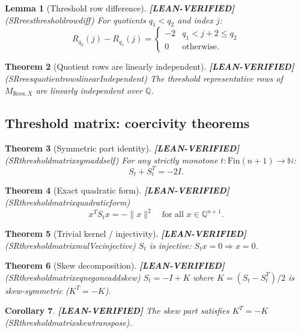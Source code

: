 \documentclass[11pt]{article}
\newtheorem{theorem}{Theorem}[section]
\newtheorem{lemma}[theorem]{Lemma}
\newtheorem{corollary}[theorem]{Corollary}
\theoremstyle{remark}
\newcommand{\LEANVERIFIED}{\textbf{\color{green!60!black}[LEAN-VERIFIED]}}
\DeclareRobustCommand{\_}{\ifmmode\text{\textunderscore}\else\textunderscore\allowbreak\fi}
\begin{document}
\begin{lemma}[Threshold row difference] \LEANVERIFIED{} \textnormal{(SR\_rees\_threshold\_row\_diff)}
For quotients $q_1 < q_2$ and index $j$:
\[
R_{q_2}(j) - R_{q_1}(j) = \begin{cases} -2 & q_1 < j+2 \leq q_2 \\ 0 & \text{otherwise.} \end{cases}
\]
\end{lemma}

\begin{theorem}[Quotient rows are linearly independent] \LEANVERIFIED{} \textnormal{(SR\_rees\_quotient\_rows\_linearIndependent)}
The threshold representative rows of $M_{\mathrm{Rees},X}$ are linearly independent over $\mathbb{Q}$.
\end{theorem}

\subsection{Threshold matrix: coercivity theorems}

\begin{theorem}[Symmetric part identity] \LEANVERIFIED{} \textnormal{(SR\_threshold\_matrix\_sym\_add\_self)}
For any strictly monotone $t : \mathrm{Fin}(n+1) \to \mathbb{N}$:
\[
S_t + S_t^T = -2I.
\]
\end{theorem}

\begin{theorem}[Exact quadratic form] \LEANVERIFIED{} \textnormal{(SR\_threshold\_matrix\_quadratic\_form)}
\[
x^T S_t x = -\|x\|^2 \quad \text{for all } x \in \mathbb{Q}^{n+1}.
\]
\end{theorem}

\begin{theorem}[Trivial kernel / injectivity] \LEANVERIFIED{} \textnormal{(SR\_threshold\_matrix\_mulVec\_injective)}
$S_t$ is injective: $S_t x = 0 \Rightarrow x = 0$.
\end{theorem}

\begin{theorem}[Skew decomposition] \LEANVERIFIED{} \textnormal{(SR\_threshold\_matrix\_eq\_neg\_one\_add\_skew)}
$S_t = -I + K$ where $K = (S_t - S_t^T)/2$ is skew-symmetric ($K^T = -K$).
\end{theorem}

\begin{corollary} \LEANVERIFIED{}
The skew part satisfies $K^T = -K$ (SR\_threshold\_matrix\_skew\_transpose).
\end{corollary}
\end{document}
